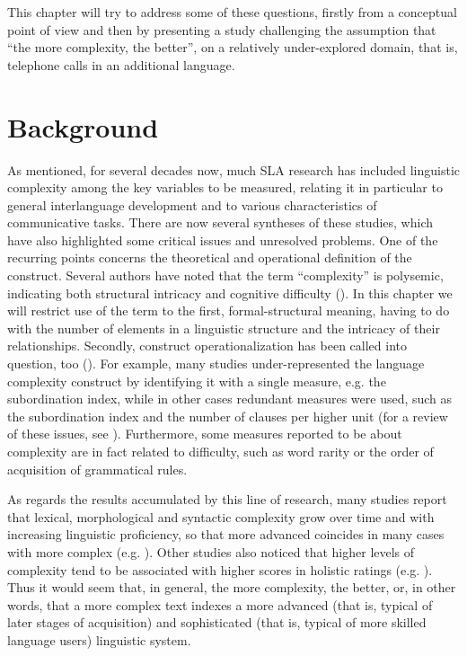 \documentclass[output=paper]{langscibook}
\begin{document}
This chapter will try to address some of these questions, firstly from a conceptual point of view and then by presenting a study challenging the assumption that “the more complexity, the better”, on a relatively under-explored domain, that is, telephone calls in an additional language.

\section{Background}\label{sec:pallotti:2}

As mentioned, for several decades now, much SLA research has included linguistic complexity among the key variables to be measured, relating it in particular to general interlanguage development and to various characteristics of communicative tasks. There are now several syntheses of these studies, which have also highlighted some critical issues and unresolved problems. One of the recurring points concerns the theoretical and operational definition of the construct. Several authors have noted that the term “complexity” is polysemic, indicating both structural intricacy and cognitive difficulty (\citealt{Pallotti2009, Pallotti2015, BultéHousen2012}). In this chapter we will restrict use of the term to the first, formal-structural meaning, having to do with the number of elements in a linguistic structure and the intricacy of their relationships. Secondly, construct operationalization has been called into question, too (\citealt{NorrisOrtega2009, BultéHousen2012, Pallotti2015}). For example, many studies under-represented the language complexity construct by identifying it with a single measure, e.g. the subordination index, while in other cases redundant measures were used, such as the subordination index and the number of clauses per higher unit (for a review of these issues, see \citealt{NorrisOrtega2009, BultéHousen2012}). Furthermore, some measures reported to be about complexity are in fact related to difficulty, such as word rarity or the order of acquisition of grammatical rules.

As regards the results accumulated by this line of research, many studies report that lexical, morphological and syntactic complexity grow over time and with increasing linguistic proficiency, so that more advanced coincides in many cases with more complex (e.g. \citealt{CrossleyEtAl2011, BultéHousen2018, Vercellotti2018, BarrotAgdeppa2021}). Other studies also noticed that higher levels of complexity tend to be associated with higher scores in holistic ratings (e.g. \citealt{YangEtAl2015, KyleCrossley2018, LahuertaMartínez2018, BiJiang2020}). Thus it would seem that, in general, the more complexity, the better, or, in other words, that a more complex text indexes a more advanced (that is, typical of later stages of acquisition) and sophisticated (that is, typical of more skilled language users) linguistic system.
\end{document}
